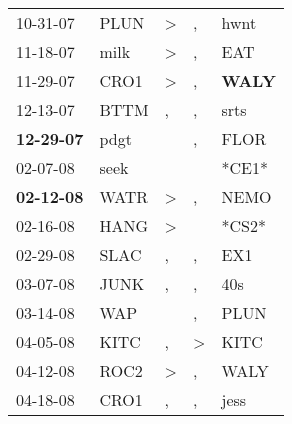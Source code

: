 \begin{supertabular}{p{0.07\textwidth}p{0.06\textwidth}p{0.02\textwidth}p{0.02\textwidth}p{0.06\textwidth}}
          10-31-07\textsuperscript{} &           PLUN\textsuperscript{} &     \textgreater &                , &           hwnt\textsuperscript{} \\
          11-18-07\textsuperscript{} &           milk\textsuperscript{} &     \textgreater &                , &            EAT\textsuperscript{} \\
          11-29-07\textsuperscript{} &           CRO1\textsuperscript{} &     \textgreater &                , &  \textbf{WALY\textsuperscript{}} \\
          12-13-07\textsuperscript{} &           BTTM\textsuperscript{} &                , &                , &           srts\textsuperscript{} \\
 \textbf{12-29-07\textsuperscript{}} &           pdgt\textsuperscript{} &                  &                , &           FLOR\textsuperscript{} \\
          02-07-08\textsuperscript{} &           seek\textsuperscript{} &                  &                  &                            *CE1* \\
 \textbf{02-12-08\textsuperscript{}} &           WATR\textsuperscript{} &     \textgreater &                , &           NEMO\textsuperscript{} \\
          02-16-08\textsuperscript{} &           HANG\textsuperscript{} &     \textgreater &                  &                            *CS2* \\
          02-29-08\textsuperscript{} &           SLAC\textsuperscript{} &                , &                , &            EX1\textsuperscript{} \\
          03-07-08\textsuperscript{} &           JUNK\textsuperscript{} &                , &                , &            40s\textsuperscript{} \\
          03-14-08\textsuperscript{} &            WAP\textsuperscript{} &                  &                , &           PLUN\textsuperscript{} \\
          04-05-08\textsuperscript{} &           KITC\textsuperscript{} &                , &     \textgreater &           KITC\textsuperscript{} \\
          04-12-08\textsuperscript{} &           ROC2\textsuperscript{} &     \textgreater &                , &           WALY\textsuperscript{} \\
          04-18-08\textsuperscript{} &           CRO1\textsuperscript{} &                , &                , &           jess\textsuperscript{} \\

\end{supertabular}
